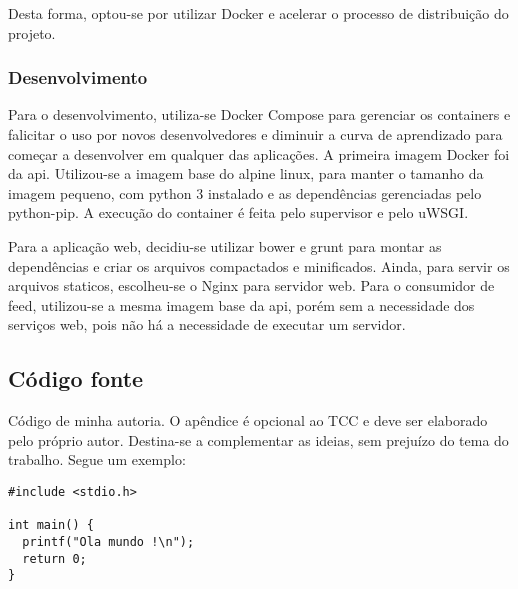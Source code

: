 \documentclass[
	12pt,				%
	openright,			%
	oneside,			%
	a4paper,			%
	chapter=TITLE,		%
	section=TITLE,		%
	english,			%
	french,				%
	spanish,			%
	brazil				%
	]{abntex2}
\begin{document}
Desta forma, optou-se por utilizar Docker e acelerar o processo de distribuição do projeto.

\subsection{Desenvolvimento}

Para o desenvolvimento, utiliza-se Docker Compose para gerenciar os containers e falicitar o uso por novos desenvolvedores e diminuir a curva de aprendizado para começar a desenvolver em qualquer das aplicações. A primeira imagem Docker foi da api. Utilizou-se a imagem base do alpine linux, para manter o tamanho da imagem pequeno, com python 3 instalado e as dependências gerenciadas pelo python-pip. A execução do container é feita pelo supervisor e pelo uWSGI.

Para a aplicação web, decidiu-se utilizar bower e grunt para montar as dependências e criar os arquivos compactados e minificados. Ainda, para servir os arquivos staticos, escolheu-se o Nginx para servidor web. Para o consumidor de feed, utilizou-se a mesma imagem base da api, porém sem a necessidade dos serviços web, pois não há a necessidade de executar um servidor.





%
%


\begin{apendicesenv}

\chapter{Código fonte}
Código de minha autoria. O apêndice é opcional ao TCC e deve ser elaborado pelo próprio autor. Destina-se a complementar as ideias, sem prejuízo do tema do trabalho. Segue um exemplo:

\scriptsize
\begin{lstlisting}
#include <stdio.h>

int main() {
  printf("Ola mundo !\n");
  return 0;
}
\end{lstlisting}

\end{apendicesenv}
\end{document}
